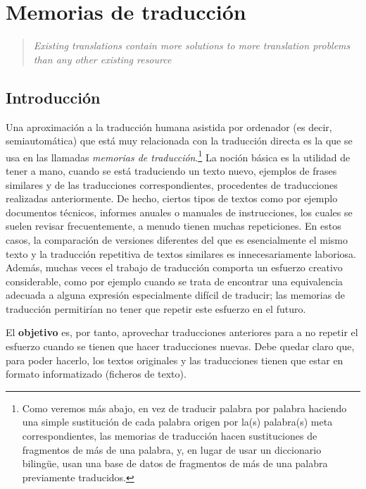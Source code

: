 \chapter{Memorias de traducción} \label{se:memtrad} 

\begin{quote} \textsl{Existing translations contain more solutions to more translation problems than any other existing resource} \citep{isabelle93p} \end{quote} 

\section{Introducción} 

Una aproximación a la traducción humana asistida por ordenador (es decir, semiautomática) que está muy relacionada con la traducción directa es la que se usa en las llamadas \emph{memorias de traducción}.\footnote{Como veremos más abajo, en vez de traducir palabra por palabra haciendo una simple sustitución de cada palabra origen por la(s) palabra(s) meta correspondientes, las memorias de traducción hacen sustituciones de fragmentos de más de una palabra, y, en lugar de usar un diccionario bilingüe, usan una base de datos de fragmentos de más de una palabra previamente traducidos.} La noción básica \citep{somers96b,samuelson-brown96b} es la utilidad de tener a mano, cuando se está traduciendo un texto nuevo, ejemplos de frases similares y de las traducciones correspondientes, procedentes de traducciones realizadas anteriormente. De hecho, ciertos tipos de textos como por ejemplo documentos técnicos, informes anuales o manuales de instrucciones, los cuales se suelen revisar frecuentemente, a menudo tienen muchas repeticiones. En estos casos, la comparación de versiones diferentes del que es esencialmente el mismo texto y la traducción repetitiva de textos similares es innecesariamente laboriosa. Además, muchas veces el trabajo de traducción comporta un esfuerzo creativo considerable, como por ejemplo cuando se trata de encontrar una equivalencia adecuada a alguna expresión especialmente difícil de traducir; las memorias de traducción permitirían no tener que repetir este esfuerzo en el futuro. 

El \textbf{objetivo} es, por tanto, aprovechar traducciones anteriores para a no repetir el esfuerzo cuando se tienen que hacer traducciones nuevas. Debe quedar claro que, para poder hacerlo, los textos originales y las traducciones tienen que estar en formato informatizado (ficheros de texto). 

